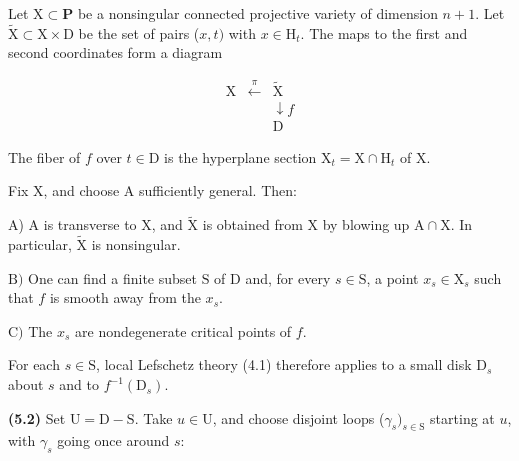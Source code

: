 \documentclass[10pt,leqno]{article}
\begin{document}
\noindent Let \(\mathrm{X}\subset \mathbf{P}\) be a nonsingular connected projective variety of dimension \(n+1\). Let \(\widetilde{\mathrm{X}}\subset \mathrm{X}\times \mathrm{D}\) be the set of pairs (\(x,t)\) with \(x\in \mathrm{H}_{t}\). The maps to the first and second coordinates form a diagram\par

\[\begin{array}{ccc}\mathrm X&\xleftarrow{\pi}&\widetilde{\mathrm X}\\ &&\downarrow\!{f}\\ &&\mathrm D\end{array}\tag{5.1.1}\]

\noindent The fiber of \(f\) over \(t\in \mathrm{D}\) is the hyperplane section \(\mathrm{X}_{t}=\mathrm{X}\cap \mathrm{H}_{t}\) of \(\mathrm{X}\).\par{}\thispagestyle{signature37}

\clearpage

\label{physical-19}

\noindent Fix \(\mathrm{X}\), and choose \(\mathrm{A}\) sufficiently general. Then:\par

\noindent A) \(\mathrm{A}\) is transverse to \(\mathrm{X}\), and \(\widetilde{\mathrm{X}}\) is obtained from \(\mathrm{X}\) by blowing up \(\mathrm{A}\cap \mathrm{X}\). In particular, \(\widetilde{\mathrm{X}}\) is nonsingular.\par

\noindent \(\mathrm{B})\) One can find a finite subset \(\mathrm{S}\) of \(\mathrm{D}\) and, for every \(s\in \mathrm{S}\), a point \(x_{s}\in \mathrm{X}_{s}\) such that \(f\) is smooth away from the \(x_{s}\).\par

\noindent \(\mathrm{C})\) The \(x_{s}\) are nondegenerate critical points of \(f\).\par

\noindent For each \(s\in \mathrm{S}\), local Lefschetz theory (4.1) therefore applies to a small disk \(\mathrm{D}_{s}\) about \(s\) and to \(f^{- 1}(\mathrm{D}_{s})\).\par

\noindent \textbf{(5.2)} Set \(\mathrm{U}=\mathrm{D}- \mathrm{S}\). Take \(u\in \mathrm{U}\), and choose disjoint loops (\(\gamma _{s})_{s\in \mathrm{S}}\) starting at \(u\), with \(\gamma _{s}\) going once around \(s\):\par
\end{document}
